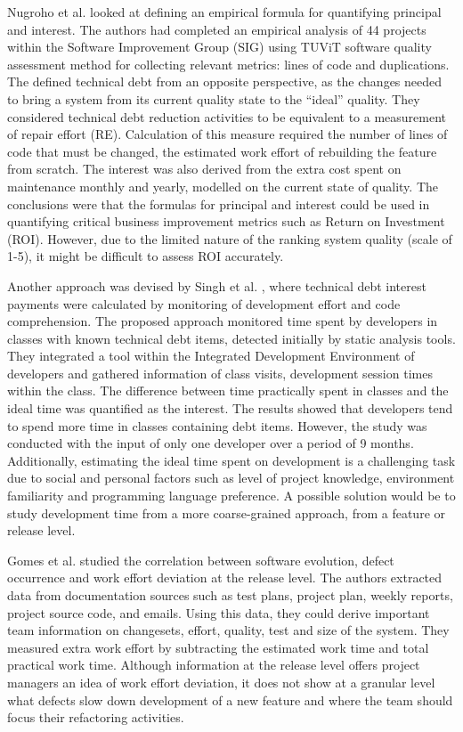 \documentclass{mprop}
\begin{document}
Nugroho et al. \cite{Nugroho2011} looked at defining an empirical formula for
quantifying principal and interest. The authors had completed an empirical
analysis of 44 projects within the Software Improvement Group (SIG) using TUViT
software quality assessment method for collecting relevant metrics: lines of
code and duplications. The defined technical debt from an opposite perspective,
as the changes needed to bring a system from its current quality state to the
``ideal'' quality. They considered technical debt reduction activities to be
equivalent to a measurement of repair effort (RE). Calculation of this measure
required the number of lines of code that must be changed, the estimated work
effort of rebuilding the feature from scratch. The interest was also derived
from the extra cost spent on maintenance monthly and yearly, modelled on the
current state of quality. The conclusions were that the formulas for principal
and interest could be used in quantifying critical business improvement metrics
such as Return on Investment (ROI). However, due to the limited nature of the
ranking system quality (scale of 1-5), it might be difficult to assess ROI
accurately.


Another approach was devised by Singh et al. \cite{Singh2014}, where technical
debt interest payments were calculated by monitoring of development effort and
code comprehension. The proposed approach monitored time spent by developers in
classes with known technical debt items, detected initially by static analysis
tools. They integrated a tool within the Integrated Development Environment of
developers and gathered information of class visits, development session times
within the class. The difference between time practically spent in classes and
the ideal time was quantified as the interest. The results showed that
developers tend to spend more time in classes containing debt items. However,
the study was conducted with the input of only one developer over a period of 9
months. Additionally, estimating the ideal time spent on development is a
challenging task due to social and personal factors such as level of project
knowledge, environment familiarity and programming language preference. A
possible solution would be to study development time from a more coarse-grained
approach, from a feature or release level.

Gomes et al. \cite{Gomes2011} studied the correlation between software
evolution, defect occurrence and work effort deviation at the release level. The
authors extracted data from documentation sources such as test plans, project
plan, weekly reports, project source code, and emails. Using this data, they
could derive important team information on changesets, effort, quality, test and
size of the system. They measured extra work effort by subtracting the estimated
work time and total practical work time. Although information at the release
level offers project managers an idea of work effort deviation, it does not show
at a granular level what defects slow down development of a new feature and
where the team should focus their refactoring activities.
\end{document}

